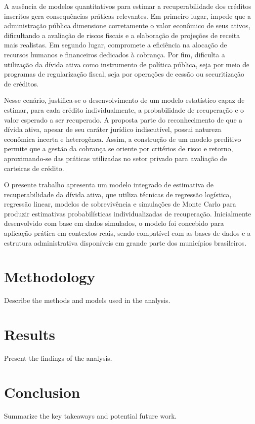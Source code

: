 \documentclass[a4paper,12pt]{article}
\begin{document}
A ausência de modelos quantitativos para estimar a recuperabilidade dos créditos inscritos gera consequências práticas relevantes. Em primeiro lugar, impede que a administração pública dimensione corretamente o valor econômico de seus ativos, dificultando a avaliação de riscos fiscais e a elaboração de projeções de receita mais realistas. Em segundo lugar, compromete a eficiência na alocação de recursos humanos e financeiros dedicados à cobrança. Por fim, dificulta a utilização da dívida ativa como instrumento de política pública, seja por meio de programas de regularização fiscal, seja por operações de cessão ou securitização de créditos.

Nesse cenário, justifica-se o desenvolvimento de um modelo estatístico capaz de estimar, para cada crédito individualmente, a probabilidade de recuperação e o valor esperado a ser recuperado. A proposta parte do reconhecimento de que a dívida ativa, apesar de seu caráter jurídico indiscutível, possui natureza econômica incerta e heterogênea. Assim, a construção de um modelo preditivo permite que a gestão da cobrança se oriente por critérios de risco e retorno, aproximando-se das práticas utilizadas no setor privado para avaliação de carteiras de crédito.

O presente trabalho apresenta um modelo integrado de estimativa de recuperabilidade da dívida ativa, que utiliza técnicas de regressão logística, regressão linear, modelos de sobrevivência e simulações de Monte Carlo para produzir estimativas probabilísticas individualizadas de recuperação. Inicialmente desenvolvido com base em dados simulados, o modelo foi concebido para aplicação prática em contextos reais, sendo compatível com as bases de dados e a estrutura administrativa disponíveis em grande parte dos municípios brasileiros. 

\section{Methodology}
Describe the methods and models used in the analysis.

\section{Results}
Present the findings of the analysis.

\section{Conclusion}
Summarize the key takeaways and potential future work.

\newpage


\end{document}

